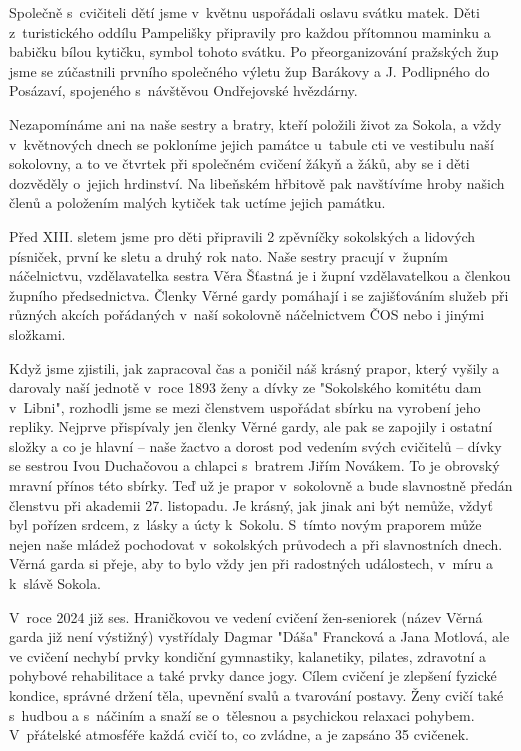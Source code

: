 \documentclass[a5paper, 11pt, twoside]{article}
\begin{document}
Společně s~cvičiteli dětí jsme v~květnu uspořádali oslavu svátku matek.
Děti z~turistického oddílu Pampelišky připravily pro každou přítomnou
maminku a babičku bílou kytičku, symbol tohoto svátku. Po
přeorganizování pražských žup jsme se zúčastnili prvního společného
výletu žup Barákovy a J. Podlipného do Posázaví, spojeného s~návštěvou
Ondřejovské hvězdárny.

Nezapomínáme ani na naše sestry a bratry, kteří položili život za
Sokola, a vždy v~květnových dnech se pokloníme jejich památce u~tabule
cti ve vestibulu naší sokolovny, a to ve čtvrtek při společném cvičení
žákyň a žáků, aby se i děti dozvěděly o~jejich hrdinství. Na libeňském
hřbitově pak navštívíme hroby našich členů a položením malých kytiček
tak uctíme jejich památku.

Před XIII. sletem jsme pro děti připravili 2 zpěvníčky sokolských a
lidových písniček, první ke sletu a druhý rok nato. Naše sestry pracují
v~župním náčelnictvu, vzdělavatelka sestra Věra Šťastná je i župní
vzdělavatelkou a členkou župního předsednictva. Členky Věrné gardy
pomáhají i se zajišťováním služeb při různých akcích pořádaných v~naší
sokolovně náčelnictvem ČOS nebo i jinými složkami.

Když jsme zjistili, jak zapracoval čas a poničil náš krásný prapor,
který vyšily a darovaly naší jednotě v~roce 1893 ženy a dívky ze
"Sokolského komitétu dam v~Libni", rozhodli jsme se mezi členstvem
uspořádat sbírku na vyrobení jeho repliky. Nejprve přispívaly jen členky
Věrné gardy, ale pak se zapojily i ostatní složky a co je hlavní -- naše
žactvo a dorost pod vedením svých cvičitelů -- dívky se sestrou Ivou
Duchačovou a chlapci s~bratrem Jiřím Novákem. To je obrovský mravní
přínos této sbírky. Teď už je prapor v~sokolovně a bude slavnostně
předán členstvu při akademii 27. listopadu. Je krásný, jak jinak ani být
nemůže, vždyť byl pořízen srdcem, z~lásky a úcty k~Sokolu. S~tímto novým
praporem může nejen naše mládež pochodovat v~sokolských průvodech a při
slavnostních dnech. Věrná garda si přeje, aby to bylo vždy jen při
radostných událostech, v~míru a k~slávě Sokola.

V~roce 2024 již ses. Hraničkovou ve vedení cvičení žen-seniorek (název
Věrná garda již není výstižný) vystřídaly Dagmar "Dáša" Francková a
Jana Motlová, ale ve cvičení nechybí prvky kondiční gymnastiky,
kalanetiky, pilates, zdravotní a pohybové rehabilitace a také prvky
dance jogy. Cílem cvičení je zlepšení fyzické kondice, správné držení
těla, upevnění svalů a tvarování postavy. Ženy cvičí také s~hudbou a
s~náčiním a snaží se o~tělesnou a psychickou relaxaci pohybem. V~přátelské
atmosféře každá cvičí to, co zvládne, a je zapsáno 35 cvičenek.
\end{document}
